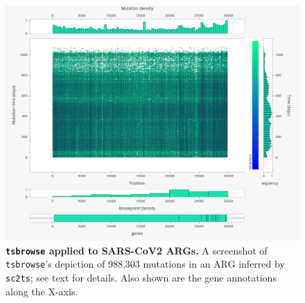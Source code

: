 \documentclass[unnumsec,webpdf,contemporary,large,namedate]{oup-authoring-template}%
\begin{document}
\begin{figure}
    \centering
    \includegraphics[width=0.95\linewidth]{figures/SuppFig4.png}
    \caption{\textbf{\texttt{tsbrowse} applied to SARS-CoV2 ARGs.}
    A screenshot of \texttt{tsbrowse}'s depiction of 988,303 mutations in an 
    ARG inferred by \texttt{sc2ts}; see  text for details. Also shown are the 
    gene annotations along the X-axis.}
    \label{fig:Supplementary_Figure_4}
\end{figure}
\end{document}
